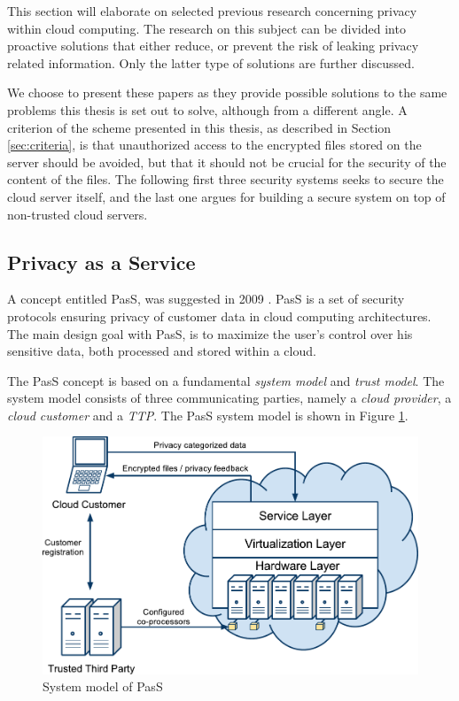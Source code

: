 \documentclass[pdftex,english,10pt,b5paper,twoside]{book}
\begin{document}
This section will elaborate on selected previous research concerning privacy
within cloud computing. The research on this subject can be divided into
proactive solutions that either reduce, or prevent the risk of leaking privacy
related information. Only the latter type of solutions are further discussed.

We choose to present these papers as they provide possible solutions to the
same problems this thesis is set out to solve, although from a different angle.
A criterion of the scheme presented in this thesis, as described in Section
\ref{sec:criteria}, is that unauthorized access to the encrypted files stored
on the server should be avoided, but that it should not be crucial for the
security of the content of the files. The following first three security
systems seeks to secure the cloud server itself, and the last one argues for
building a secure system on top of non-trusted cloud servers.

\subsection{Privacy as a Service}

A concept entitled \ac{PasS}, was suggested in 2009 \cite{PasS}. \ac{PasS} is a
set of security protocols ensuring privacy of customer data in cloud computing
architectures. The main design goal with \ac{PasS}, is to maximize the user's
control over his sensitive data, both processed and stored within a cloud.

The \ac{PasS} concept is based on a fundamental \emph{system model} and
\emph{trust model}. The system model consists of three communicating parties,
namely a \emph{cloud provider}, a \emph{cloud customer} and a \emph{\ac{TTP}}.
The \ac{PasS} system model is shown in Figure \ref{fig:RW:PasS}.

\begin{figure}[h!]
    \centering
    \includegraphics[scale=0.6]{ArchitecturePasS.pdf}
    \caption{System model of PasS}
    \label{fig:RW:PasS}
\end{figure}
\end{document}
